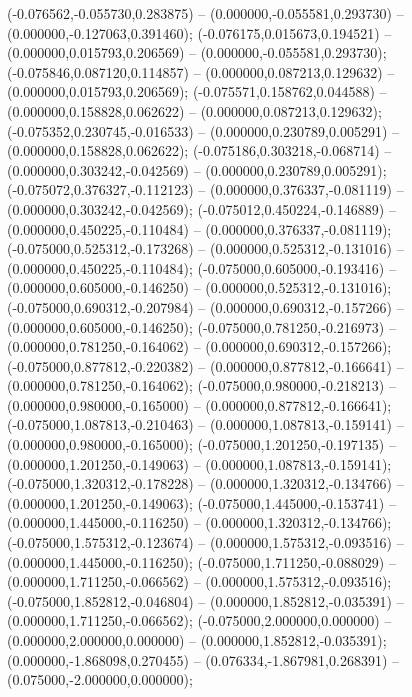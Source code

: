  (-0.076562,-0.055730,0.283875) -- (0.000000,-0.055581,0.293730) -- (0.000000,-0.127063,0.391460);
 (-0.076175,0.015673,0.194521) -- (0.000000,0.015793,0.206569) -- (0.000000,-0.055581,0.293730);
 (-0.075846,0.087120,0.114857) -- (0.000000,0.087213,0.129632) -- (0.000000,0.015793,0.206569);
 (-0.075571,0.158762,0.044588) -- (0.000000,0.158828,0.062622) -- (0.000000,0.087213,0.129632);
 (-0.075352,0.230745,-0.016533) -- (0.000000,0.230789,0.005291) -- (0.000000,0.158828,0.062622);
 (-0.075186,0.303218,-0.068714) -- (0.000000,0.303242,-0.042569) -- (0.000000,0.230789,0.005291);
 (-0.075072,0.376327,-0.112123) -- (0.000000,0.376337,-0.081119) -- (0.000000,0.303242,-0.042569);
 (-0.075012,0.450224,-0.146889) -- (0.000000,0.450225,-0.110484) -- (0.000000,0.376337,-0.081119);
 (-0.075000,0.525312,-0.173268) -- (0.000000,0.525312,-0.131016) -- (0.000000,0.450225,-0.110484);
 (-0.075000,0.605000,-0.193416) -- (0.000000,0.605000,-0.146250) -- (0.000000,0.525312,-0.131016);
 (-0.075000,0.690312,-0.207984) -- (0.000000,0.690312,-0.157266) -- (0.000000,0.605000,-0.146250);
 (-0.075000,0.781250,-0.216973) -- (0.000000,0.781250,-0.164062) -- (0.000000,0.690312,-0.157266);
 (-0.075000,0.877812,-0.220382) -- (0.000000,0.877812,-0.166641) -- (0.000000,0.781250,-0.164062);
 (-0.075000,0.980000,-0.218213) -- (0.000000,0.980000,-0.165000) -- (0.000000,0.877812,-0.166641);
 (-0.075000,1.087813,-0.210463) -- (0.000000,1.087813,-0.159141) -- (0.000000,0.980000,-0.165000);
 (-0.075000,1.201250,-0.197135) -- (0.000000,1.201250,-0.149063) -- (0.000000,1.087813,-0.159141);
 (-0.075000,1.320312,-0.178228) -- (0.000000,1.320312,-0.134766) -- (0.000000,1.201250,-0.149063);
 (-0.075000,1.445000,-0.153741) -- (0.000000,1.445000,-0.116250) -- (0.000000,1.320312,-0.134766);
 (-0.075000,1.575312,-0.123674) -- (0.000000,1.575312,-0.093516) -- (0.000000,1.445000,-0.116250);
 (-0.075000,1.711250,-0.088029) -- (0.000000,1.711250,-0.066562) -- (0.000000,1.575312,-0.093516);
 (-0.075000,1.852812,-0.046804) -- (0.000000,1.852812,-0.035391) -- (0.000000,1.711250,-0.066562);
 (-0.075000,2.000000,0.000000) -- (0.000000,2.000000,0.000000) -- (0.000000,1.852812,-0.035391);
 (0.000000,-1.868098,0.270455) -- (0.076334,-1.867981,0.268391) -- (0.075000,-2.000000,0.000000);
